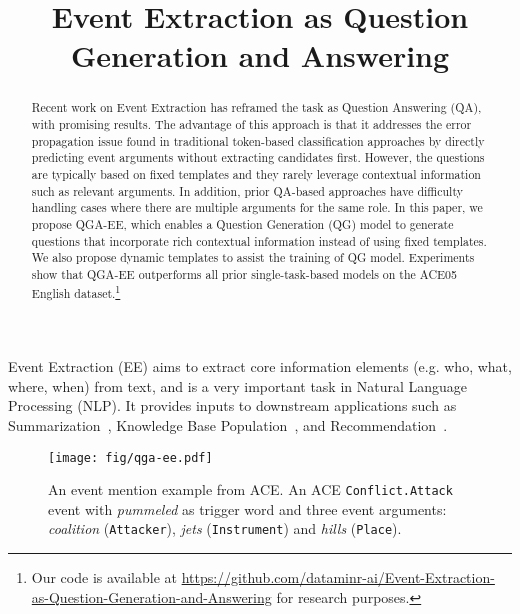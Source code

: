 \title{Event Extraction as Question Generation and Answering}



\maketitle
\begin{abstract}

Recent work on Event Extraction has reframed the task as  Question Answering (QA), with promising results.
The advantage of this approach is that it addresses the error propagation issue found in traditional token-based classification approaches by directly predicting event arguments without extracting candidates first. However, the questions are typically based on fixed templates and they rarely leverage contextual information such as relevant arguments. In addition, prior QA-based approaches have difficulty handling cases where there are multiple arguments for the same role. In this paper, we propose QGA-EE, which enables a Question Generation (QG) model to generate questions that incorporate rich contextual information instead of using fixed templates. We also propose dynamic templates to assist the training of QG model.
Experiments show that QGA-EE outperforms all prior single-task-based models on the ACE05 English dataset.\footnote{Our code is available at \url{https://github.com/dataminr-ai/Event-Extraction-as-Question-Generation-and-Answering} for research purposes.}

\end{abstract}

Event Extraction (EE) aims to extract core information elements (e.g. who, what, where, when) from text, and is a very important task in Natural Language Processing (NLP). It provides inputs to downstream applications such as Summarization~\cite{filatova-hatzivassiloglou-2004-event}, Knowledge Base Population~\cite{ji2011knowledge}, and Recommendation~\cite{lu2016cross}. 

\begin{figure}[ht]
    \centering
    \texttt{[image: fig/qga-ee.pdf]}
    \caption{An event mention example from ACE. An ACE \texttt{Conflict.Attack} event with \textit{pummeled} as trigger word and three event arguments: \textit{coalition} (\texttt{Attacker}),  \textit{jets} (\texttt{Instrument}) and \textit{hills} (\texttt{Place}).}
    \label{fig:ace_intro}
\end{figure}

